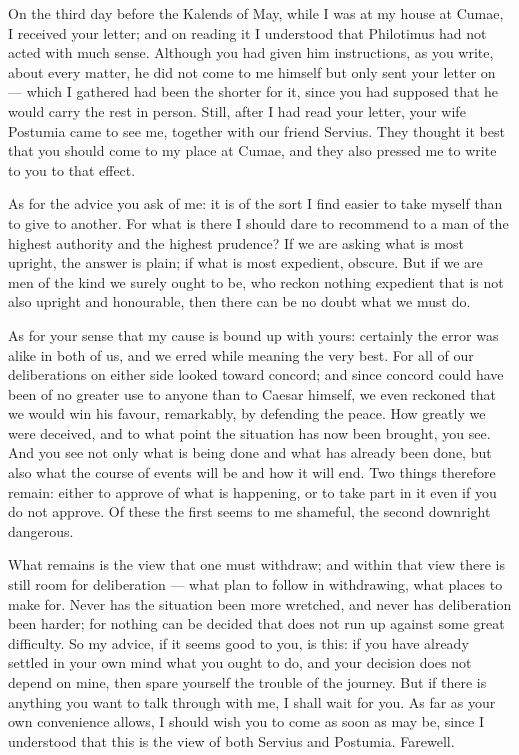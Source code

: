 

 On the third day before the Kalends of May, while I was at my house at Cumae, I received your letter; and on reading it I understood that Philotimus had not acted with much sense. Although you had given him instructions, as you write, about every matter, he did not come to me himself but only sent your letter on --- which I gathered had been the shorter for it, since you had supposed that he would carry the rest in person. Still, after I had read your letter, your wife Postumia came to see me, together with our friend Servius. They thought it best that you should come to my place at Cumae, and they also pressed me to write to you to that effect.

 As for the advice you ask of me: it is of the sort I find easier to take myself than to give to another. For what is there I should dare to recommend to a man of the highest authority and the highest prudence? If we are asking what is most upright, the answer is plain; if what is most expedient, obscure. But if we are men of the kind we surely ought to be, who reckon nothing expedient that is not also upright and honourable, then there can be no doubt what we must do.

 As for your sense that my cause is bound up with yours: certainly the error was alike in both of us, and we erred while meaning the very best. For all of our deliberations on either side looked toward concord; and since concord could have been of no greater use to anyone than to Caesar himself, we even reckoned that we would win his favour, remarkably, by defending the peace. How greatly we were deceived, and to what point the situation has now been brought, you see. And you see not only what is being done and what has already been done, but also what the course of events will be and how it will end. Two things therefore remain: either to approve of what is happening, or to take part in it even if you do not approve. Of these the first seems to me shameful, the second downright dangerous.

 What remains is the view that one must withdraw; and within that view there is still room for deliberation --- what plan to follow in withdrawing, what places to make for. Never has the situation been more wretched, and never has deliberation been harder; for nothing can be decided that does not run up against some great difficulty. So my advice, if it seems good to you, is this: if you have already settled in your own mind what you ought to do, and your decision does not depend on mine, then spare yourself the trouble of the journey. But if there is anything you want to talk through with me, I shall wait for you. As far as your own convenience allows, I should wish you to come as soon as may be, since I understood that this is the view of both Servius and Postumia. Farewell.
